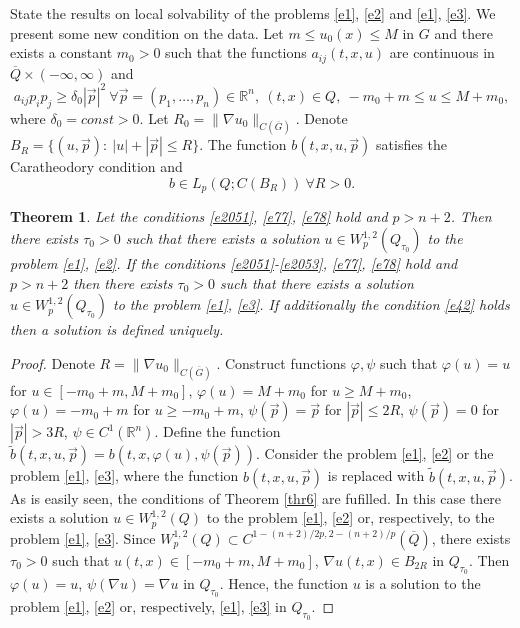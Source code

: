 \documentclass{article}
\theoremstyle{plain}
\newtheorem{theorem}{Theorem}
\begin{document}
State the results on local solvability of the problems  {\rm \eqref{e1}, \eqref{e2}} and {\rm \eqref{e1}, \eqref{e3}}.   
We present  some new condition on the data. Let $m\leq u_0(x)\leq M$ in $G$ and there exists a constant $m_0>0$ such that
  the functions $a_{ij}(t,x,u)$ are continuous in $\overline{Q}\times (-\infty,\infty)$ and
\begin{equation}\label{e77}
a_{ij}p_ip_j\geq \delta_0|\vec{p}|^2\  \forall \vec{p}=(p_1,\ldots,p_n) \in {\mathbb R}^n, \ (t,x)\in Q, \ -m_0+m\leq u\leq M+m_0,
\end{equation}
where  $\delta_0=const>0$. Let   $R_0=\|\nabla u_0\|_{C(\overline{G})}$. Denote  $B_R=\{(u,\vec{p}):\ |u|+|\vec{p}|\leq R\}$.
The function $b(t,x,u,\vec{p})$ satisfies the Caratheodory condition and
\begin{equation}\label{e78}
b\in L_p(Q;C(B_R))\  \forall R>0. 
\end{equation}
 
 \begin{theorem} \label{thr7}
 Let  the conditions    {\rm \eqref{e2051}, \eqref{e77}, \eqref{e78}} hold  and  $p>n+2$. Then there exists  $\tau_0>0$ such that 
 there exists a solution $u\in W_p^{1,2}(Q_{\tau_0})$  to the problem  {\rm \eqref{e1}, \eqref{e2}}.
       If the conditions {\rm \eqref{e2051}-\eqref{e2053}, \eqref{e77}, \eqref{e78}} hold and  $p>n+2$ then there exists  $\tau_0>0$ such that 
          there exists a solution $u\in W_p^{1,2}(Q_{\tau_0})$ to the problem  {\rm \eqref{e1}, \eqref{e3}}.
If additionally the condition  \eqref{e42} holds then a solution is defined uniquely. 
 \end{theorem}

\begin{proof} Denote   $R=\|\nabla u_0\|_{C(\overline{G})}$. Construct functions  $\varphi,\psi$ such that 
$\varphi(u)=u$ for $u\in [-m_0+m,M+m_0]$,  
$\varphi(u)=M+m_0$ for $u\geq M+m_0$, $\varphi(u)=-m_0+m$ for $u\geq -m_0+m$, $\psi(\vec{p})=\vec{p}$    for $|\vec{p}|\leq 2R$, $\psi(\vec{p})=0$      for  $|\vec{p}|>3R$,
$\psi\in C^1({\mathbb R}^n)$. Define the function  $\tilde{b}(t,x,u,\vec{p})=b(t,x,\varphi(u),\psi(\vec{p}))$. 
Consider the problem 
\eqref{e1}, \eqref{e2} or the problem  \eqref{e1}, \eqref{e3}, where the function  $b(t,x,u,\vec{p}) $ is replaced with  $\tilde{b}(t,x,u,\vec{p})$. 
As is easily seen, the conditions of Theorem  \ref{thr6} are fufilled. 
In this case there exists a solution  $u\in W_p^{1,2}(Q)$ to the problem   \eqref{e1}, \eqref{e2} or, respectively, to the problem \eqref{e1}, \eqref{e3}.
Since  $W_p^{1,2}(Q)\subset C^{1-(n+2)/2p, 2-(n+2)/p}(\overline{Q})$, there exists  $\tau_0>0$ such that  $u(t,x)\in [-m_0+m,M+m_0]$, $\nabla u(t,x)\in B_{2R} $
in $Q_{\tau_0}$. Then  $\varphi(u)=u$, $\psi(\nabla u)=\nabla u$ in  $Q_{\tau_0}$. Hence, the function  $u$ is a solution to the problem 
\eqref{e1}, \eqref{e2} or, respectively,  \eqref{e1}, \eqref{e3} in $Q_{\tau_0}$.
\end{proof}
 
\end{document}
